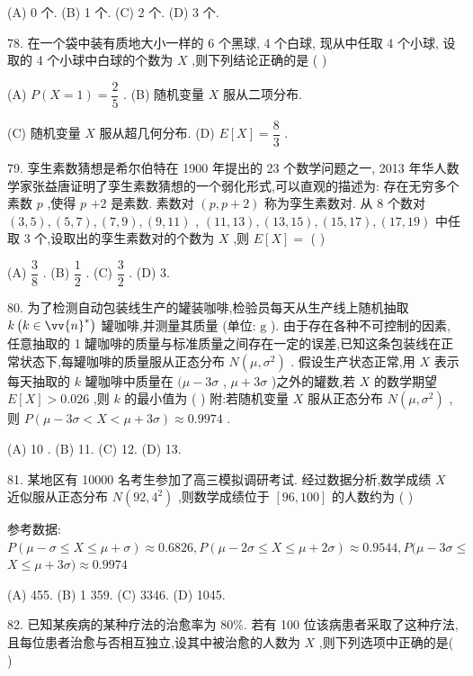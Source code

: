 (A) 0 个. (B) 1 个. (C) 2 个. (D) 3 个.

78. 在一个袋中装有质地大小一样的 6 个黑球, 4 个白球, 现从中任取 4 个小球, 设取的 4 个小球中白球的个数为 $X$ ,则下列结论正确的是 (   )

(A) $P\left( {X = 1}\right)  = \dfrac{2}{5}$ . (B) 随机变量 $X$ 服从二项分布.

(C) 随机变量 $X$ 服从超几何分布. (D) $E\left\lbrack  X\right\rbrack   = \dfrac{8}{3}$ .

79. 孪生素数猜想是希尔伯特在 1900 年提出的 23 个数学问题之一, 2013 年华人数学家张益唐证明了孪生素数猜想的一个弱化形式,可以直观的描述为: 存在无穷多个素数 $p$ ,使得 $p$  $+ 2$ 是素数. 素数对 $\left( {p,p + 2}\right)$ 称为孪生素数对. 从 8 个数对 $\left( {3,5}\right) ,\left( {5,7}\right) ,\left( {7,9}\right) ,\left( {9,{11}}\right)$ , $\left( {{11},{13}}\right) ,\left( {{13},{15}}\right) ,\left( {{15},{17}}\right) ,\left( {{17},{19}}\right)$ 中任取 3 个,设取出的孪生素数对的个数为 $X$ ,则 $E\left\lbrack  X\right\rbrack   =$ (   )

(A) $\dfrac{3}{8}$ . (B) $\dfrac{1}{2}$ . (C) $\dfrac{3}{2}$ . (D) 3.

80. 为了检测自动包装线生产的罐装咖啡,检验员每天从生产线上随机抽取 $k\left( {k \in  {\vv{n}}^{ * }}\right)$ 罐咖啡,并测量其质量 (单位: $\mathrm{g}$ ). 由于存在各种不可控制的因素,任意抽取的 1 罐咖啡的质量与标准质量之间存在一定的误差,已知这条包装线在正常状态下,每罐咖啡的质量服从正态分布 $N\left( {\mu ,{\sigma }^{2}}\right)$ . 假设生产状态正常,用 $X$ 表示每天抽取的 $k$ 罐咖啡中质量在 $(\mu  - {3\sigma }$ , $\mu  + {3\sigma }$ )之外的罐数,若 $X$ 的数学期望 $E\left\lbrack  X\right\rbrack   > {0.026}$ ,则 $k$ 的最小值为 (   ) 附:若随机变量 $X$ 服从正态分布 $N\left( {\mu ,{\sigma }^{2}}\right)$ ,则 $P\left( {\mu  - {3\sigma } < X < \mu  + {3\sigma }}\right)  \approx  {0.9974}$ .

(A) 10 . (B) 11. (C) 12. (D) 13.

81. 某地区有 10000 名考生参加了高三模拟调研考试. 经过数据分析,数学成绩 $X$ 近似服从正态分布 $N\left( {{92},{4}^{2}}\right)$ ,则数学成绩位于 $\left\lbrack  {{96},{100}}\right\rbrack$ 的人数约为 (   )

参考数据: $P\left( {\mu  - \sigma  \leq  X \leq  \mu  + \sigma }\right)  \approx  {0.6826},P\left( {\mu  - {2\sigma } \leq  X \leq  \mu  + {2\sigma }}\right)  \approx  {0.9544},P(\mu  - {3\sigma } \leq$  $X \leq  \mu  + {3\sigma }) \approx  {0.9974}$

(A) 455. (B) 1 359. (C) 3346. (D) 1045.

82. 已知某疾病的某种疗法的治愈率为 80\%. 若有 100 位该病患者采取了这种疗法,且每位患者治愈与否相互独立,设其中被治愈的人数为 $X$ ,则下列选项中正确的是(   )

